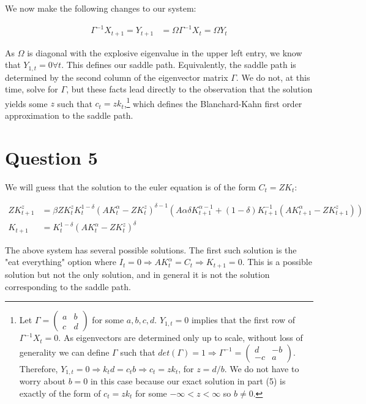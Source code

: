 \documentclass[11pt]{article} %
\begin{document}
We now make the following changes to our system:

\begin{align*}
\Gamma^{-1} X_{t+1} = Y_{t+1} &= \Omega\Gamma^{-1} X_{t} = \Omega Y_{t}
\end{align*}

As $\Omega$ is diagonal with the explosive eigenvalue in the upper left entry, we know that $Y_{1,t} = 0 \forall t$. This defines our saddle path. Equivalently, the saddle path is determined by the second column of the eigenvector matrix $\Gamma$. We do not, at this time, solve for $\Gamma$, but these facts lead directly to the observation that the solution yields some $z$ such that $c_t = z k_t$,\footnote{Let $\Gamma = \begin{pmatrix} a & b\\ c  & d \end{pmatrix}$ for some $a,b,c,d.$ $Y_{1,t} = 0$ implies that the first row of $\Gamma^{-1}X_{t} = 0.$ As eigenvectors are determined only up to scale, without loss of generality we can define $\Gamma $ such that $det(\Gamma) = 1 \Rightarrow \Gamma^{-1} =  \begin{pmatrix} d & -b\\ -c  & a \end{pmatrix}$. Therefore, $Y_{1,t} = 0 \Rightarrow k_{t}d = c_tb \Rightarrow  c_t = zk_t$, for $z = d/b$. We do not have to worry about $b = 0$ in this case because our exact solution in part (5) is exactly of the form of $c_t = zk_t$ for some $-\infty<z<\infty$ so $b\neq 0.$ } which defines the Blanchard-Kahn first order approximation to the saddle path.

\section{Question 5}
We will guess that the solution to the euler equation is of the form $C_t = ZK_t$:

\begin{align*}
ZK_{t+1}^z&= \beta  ZK_t^{z} K_t^{1-\delta}(AK_t^{\alpha} -  ZK_t^{z})^{\delta - 1}(A\alpha \delta K_{t+1}^{\alpha - 1}  + (1-\delta)K_{t+1}^{-1}(AK_{t+1}^{\alpha} -  ZK_{t+1}^{z}) )\\
K_{t+1} &= K_t^{1-\delta}(AK_t^{\alpha} -  ZK_t^{z})^{\delta}
\end{align*}

The above system has several possible solutions. The first such solution is the "eat everything" option where $I_t = 0 \Rightarrow AK_{t}^{\alpha} = C_t \Rightarrow K_{t+1} = 0$. This is a possible solution but not the only solution, and in general it is not the solution corresponding to the saddle path.
\end{document}
